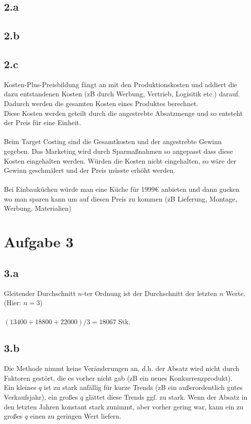 \subsection{2.a}
\subsection{2.b}
\subsection{2.c}
Kosten-Plus-Preisbildung fängt an mit den Produktionskosten und addiert die dazu entstandenen Kosten (zB durch Werbung, Vertrieb, Logisitik etc.) darauf. Dadurch werden die gesamten Kosten eines Produktes berechnet. \\
Diese Kosten werden geteilt durch die angestrebte Absatzmenge und so entsteht der Preis für eine Einheit. \\
\ \\
Beim Target Costing sind die Gesamtkosten und der angestrebte Gewinn gegeben. Das Marketing wird durch Sparmaßnahmen so angepasst dass diese Kosten eingehalten werden. Würden die Kosten nicht eingehalten, so wäre der Gewinn geschmälert und der Preis müsste erhöht werden.\\
\ \\
Bei Einbauküchen würde man eine Küche für 1999€ anbieten und dann gucken wo man sparen kann um auf diesen Preis zu kommen (zB Lieferung, Montage, Werbung, Materialien)

\section{Aufgabe 3}
\subsection{3.a}
Gleitender Durchschnitt $n$-ter Ordnung ist der Durchschnitt der letzten $n$ Werte. (Hier: $n=3$) \\
\ \\
$(13400+18800+22000)/3 = 18067$ Stk. \\

\subsection{3.b}
Die Methode nimmt keine Veränderungen an, d.h. der Absatz wird nicht durch Faktoren gestört, die es vorher nicht gab (zB ein neues Konkurrenzprodukt). \\
Ein kleines $q$ ist zu stark anfällig für kurze Trends (zB ein außerordentlich gutes Verkaufsjahr), ein großes $q$ glättet diese Trends ggf. zu stark. Wenn der Absatz in den letzten Jahren konstant stark zunimmt, aber vorher gering war, kann ein zu großes $q$ einen zu geringen Wert liefern. \\

